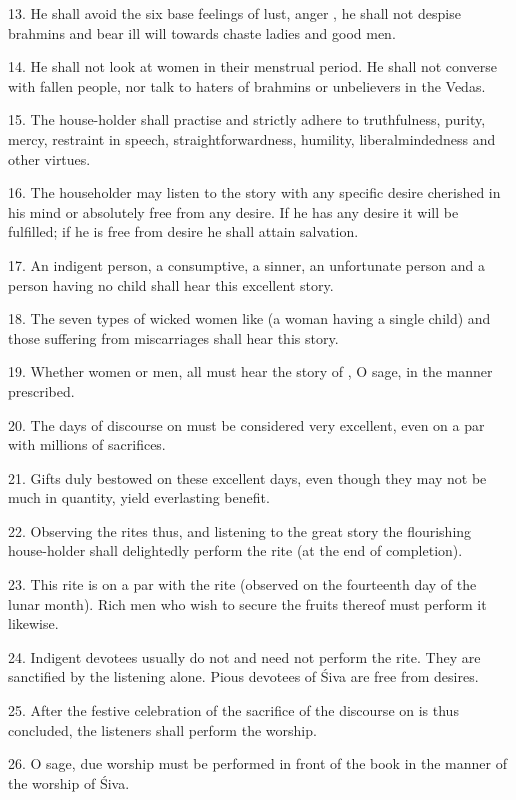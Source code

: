 13. He shall avoid the six base feelings of lust, anger \etc, he shall not
despise brahmins and bear ill will towards chaste ladies and good men.

14. He shall not look at women in their menstrual period. He shall not converse
with fallen people, nor talk to haters of brahmins or unbelievers in the Vedas.

15. The house-holder shall practise and strictly adhere to truthfulness, purity,
mercy, restraint in speech, straightforwardness, humility, liberalmindedness and
other virtues.

16. The householder may listen to the story with any specific desire cherished
in his mind or absolutely free from any desire. If he has any desire it will be
fulfilled; if he is free from desire he shall attain salvation.

17. An indigent person, a consumptive, a sinner, an unfortunate person and a
person having no child shall hear this excellent story.

18. The seven types of wicked women like  (a woman having a
single child) and those suffering from miscarriages shall hear this story.

19. Whether women or men, all must hear the story of , O sage,
in the manner prescribed.

20. The days of discourse on  must be considered very excellent,
even on a par with millions of sacrifices.

21. Gifts duly bestowed on these excellent days, even though they may not be
much in quantity, yield everlasting benefit.

22. Observing the rites thus, and listening to the great story the flourishing
house-holder shall delightedly perform the  rite (at the end of
completion).

23. This  rite is on a par with the  rite (observed
on the fourteenth day of the lunar month). Rich men who wish to secure the
fruits thereof must perform it likewise.

24. Indigent devotees usually do not and need not perform the  rite.
They are sanctified by the listening alone. Pious devotees of Śiva are free
from desires.

25. After the festive celebration of the sacrifice of the discourse on
 is thus concluded, the listeners shall perform the worship.

26. O sage, due worship must be performed in front of the book in the manner of
the worship of Śiva.

